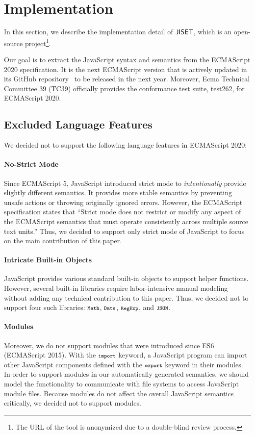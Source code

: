 \section{Implementation}\label{sec:impl}
In this section, we describe the implementation detail of \( \text{\sf JISET} \),
which is an open-source project\footnote{The URL of the tool is anonymized
due to a double-blind review process.}.

Our goal is to extract the JavaScript syntax and semantics from the
ECMAScript 2020 specification.  It is the next ECMAScript version
that is actively updated in its GitHub repository~\cite{es2020}
to be released in the next year.  Moreover, Ecma Technical Committee 39 (TC39)
officially provides the conformance test suite, test262, for ECMAScript 2020.

\subsection{Excluded Language Features}
We decided not to support the following language features in ECMAScript 2020:

\paragraph{No-Strict Mode}
Since ECMAScript 5, JavaScript introduced strict mode to
\textit{intentionally} provide slightly different semantics.  It
provides more stable semantics by preventing unsafe actions or
throwing originally ignored errors.  However, the ECMAScript
specification states that ``Strict mode does not restrict or modify
any aspect of the ECMAScript semantics that must operate consistently
across multiple source text units.''  Thus, we decided to support only
strict mode of JavaScript to focus on the main contribution of this
paper.

\paragraph{Intricate Built-in Objects}
JavaScript provides various standard built-in objects to support
helper functions.  However, several built-in libraries require
labor-intensive manual modeling without adding any technical
contribution to this paper.  Thus, we decided not to support
four such libraries: \( \texttt{\footnotesize Math} \), \( \texttt{\footnotesize Date} \),
\( \texttt{\footnotesize RegExp} \), and \( \texttt{\footnotesize JSON} \).

\paragraph{Modules}
Moreover, we do not support modules that were introduced since ES6
(ECMAScript 2015).  With the \( \texttt{\footnotesize import} \) keyword, a JavaScript
program can import other JavaScript components defined with the \(
\texttt{\footnotesize export} \) keyword in their modules.  In order to support
modules in our automatically generated semantics, we should model the
functionality to communicate with file systems to access JavaScript
module files.  Because modules do not affect the overall JavaScript
semantics critically, we decided not to support modules.

